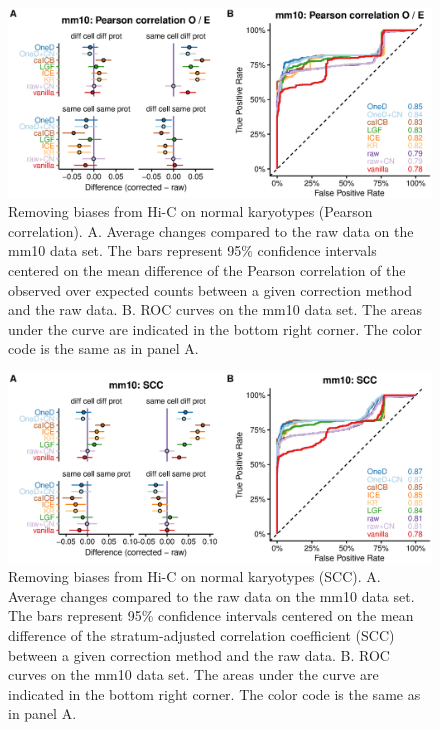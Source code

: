 \documentclass[12pt]{report}
\begin{document}
\begin{figure}
	\centerline{\includegraphics[width=\textwidth]{nar_figures/supp_figure_9.eps}}
  \caption{Removing biases from Hi-C on normal karyotypes (Pearson
correlation). A. Average changes compared to the raw data on the mm10 data
set. The bars represent 95\% confidence intervals centered on the mean
difference of the Pearson correlation of the observed over expected counts
between a given correction method and the raw data. B. ROC curves on the
mm10 data set. The areas under the curve are indicated in the bottom right
corner. The color code is the same as in panel A.}
\end{figure}

\begin{figure}
	\centerline{\includegraphics[width=\textwidth]{nar_figures/supp_figure_10.eps}}
  \caption{Removing biases from Hi-C on normal karyotypes (SCC). A.
Average changes compared to the raw data on the mm10 data set. The bars
represent 95\% confidence intervals centered on the mean difference of the
stratum-adjusted correlation coefficient (SCC) between a given correction
method and the raw data. B. ROC curves on the mm10 data set. The areas
under the curve are indicated in the bottom right corner. The color code
is the same as in panel A.}
\end{figure}
\end{document}
